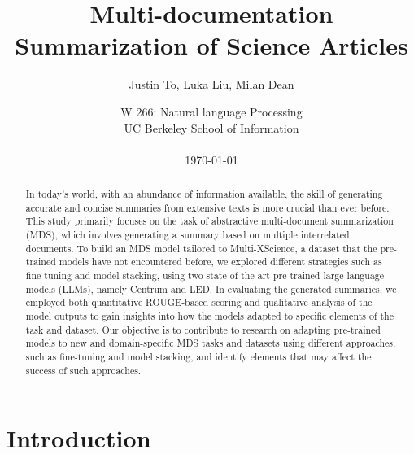 \documentclass[12pt, twocolumn]{article}
\numberwithin{equation}{section}
\begin{document}
\sloppy %
\setcounter{page}{0}

\title{Multi-documentation Summarization of Science Articles}
\author{Justin To, Luka Liu, Milan Dean}
\date{
    W 266: Natural language Processing
    \\UC Berkeley School of Information
    \\~
    \\\today
}

\onecolumn

\maketitle
\begin{abstract}%

    In today's world, with an abundance of information available, the skill of generating accurate and concise summaries from extensive texts is more crucial than ever before. This study primarily focuses on the task of abstractive multi-document summarization (MDS), which involves generating a summary based on multiple interrelated documents. To build an MDS model tailored to Multi-XScience, a dataset that the pre-trained models have not encountered before, we explored different strategies such as fine-tuning and model-stacking, using two state-of-the-art pre-trained large language models (LLMs), namely Centrum and LED. In evaluating the generated summaries, we employed both quantitative ROUGE-based scoring and qualitative analysis of the model outputs to gain insights into how the models adapted to specific elements of the task and dataset. Our objective is to contribute to research on adapting pre-trained models to new and domain-specific MDS tasks and datasets using different approaches, such as fine-tuning and model stacking, and identify elements that may affect the success of such approaches.

\end{abstract}
\thispagestyle{empty}

\newpage
\twocolumn

\section{Introduction}
\end{document}
